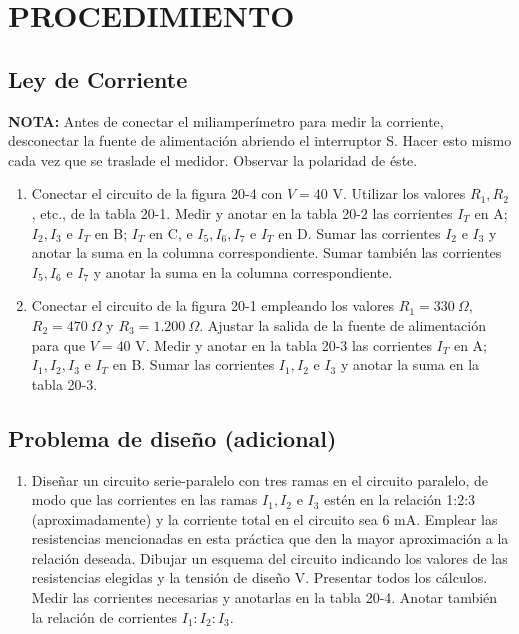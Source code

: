\documentclass[12pt, a4paper]{article}
\begin{document}
\section*{PROCEDIMIENTO}
    \subsection*{Ley de Corriente}
    \textbf{NOTA:} Antes de conectar el miliamperímetro para medir la corriente, desconectar la fuente de alimentación abriendo el interruptor S. Hacer esto mismo cada vez que se traslade el medidor. Observar la polaridad de éste.
    
    \begin{enumerate}[label=\arabic*.]
        \item Conectar el circuito de la figura 20-4 con $V=40$ V. Utilizar los valores $R_1, R_2$, etc., de la tabla 20-1. Medir y anotar en la tabla 20-2 las corrientes $I_T$ en A; $I_2, I_3$ e $I_T$ en B; $I_T$ en C, e $I_5, I_6, I_7$ e $I_T$ en D. Sumar las corrientes $I_2$ e $I_3$ y anotar la suma en la columna correspondiente. Sumar también las corrientes $I_5, I_6$ e $I_7$ y anotar la suma en la columna correspondiente.
        \item Conectar el circuito de la figura 20-1 empleando los valores $R_1 = 330~\Omega$, $R_2 = 470~\Omega$ y $R_3 = 1.200~\Omega$. Ajustar la salida de la fuente de alimentación para que $V=40$ V. Medir y anotar en la tabla 20-3 las corrientes $I_T$ en A; $I_1, I_2, I_3$ e $I_T$ en B. Sumar las corrientes $I_1, I_2$ e $I_3$ y anotar la suma en la tabla 20-3.
    \end{enumerate}

    \subsection*{Problema de diseño (adicional)}
    \begin{enumerate}[label=\arabic*., start=3]
        \item Diseñar un circuito serie-paralelo con tres ramas en el circuito paralelo, de modo que las corrientes en las ramas $I_1, I_2$ e $I_3$ estén en la relación 1:2:3 (aproximadamente) y la corriente total en el circuito sea 6 mA. Emplear las resistencias mencionadas en esta práctica que den la mayor aproximación a la relación deseada. Dibujar un esquema del circuito indicando los valores de las resistencias elegidas y la tensión de diseño V. Presentar todos los cálculos. Medir las corrientes necesarias y anotarlas en la tabla 20-4. Anotar también la relación de corrientes $I_1:I_2:I_3$.
    \end{enumerate}
    
\end{document}
